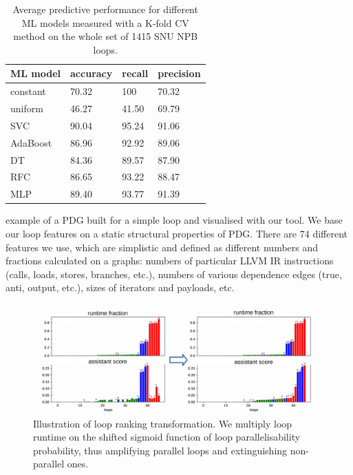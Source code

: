 \documentclass{acaces}
\begin{document}
\begin{table}
	\centering
	\begin{tabular}[c]{|p{1.5cm}|p{1.5cm}|p{1.5cm}|p{1.5cm}|}
		\hline
		ML model & accuracy & recall & precision \\
		\hline
		constant & 70.32 & 100 & 70.32\\
		\hline
		uniform & 46.27 & 41.50 & 69.79\\
		\hline
		SVC & 90.04 & 95.24 & 91.06 \\
		\hline
		AdaBoost & 86.96 & 92.92 & 89.06 \\
		\hline
		DT & 84.36 & 89.57 & 87.90 \\
		\hline
		RFC & 86.65 & 93.22 & 88.47 \\
		\hline
		MLP & 89.40 & 93.77 & 91.39 \\
		\hline
	\end{tabular}
	\caption{Average predictive performance for different ML models measured with a K-fold CV method on the whole set of 1415 SNU NPB loops.}
	\label{tab:accuracy}
\end{table}
example of a PDG built for a simple loop and visualised with our tool. We base our loop features on a static structural properties of PDG. There are 74 different features we use, which are simplistic and defined as different numbers and fractions calculated on a graphs: numbers of particular LLVM IR instructions (calls, loads, stores, branches, etc.), numbers of various dependence edges (true, anti, output, etc.), sizes of iterators and payloads, etc.\newline\null
\begin{figure}
	\centering
	\includegraphics[width=1.0\textwidth]{ft_ranking}
	\caption{Illustration of loop ranking transformation. We multiply loop runtime on the shifted sigmoid function of loop parallelisability probability, thus amplifying parallel loops and extinguishing non-parallel ones. }
	\label{ranking}
\end{figure}
\end{document}
